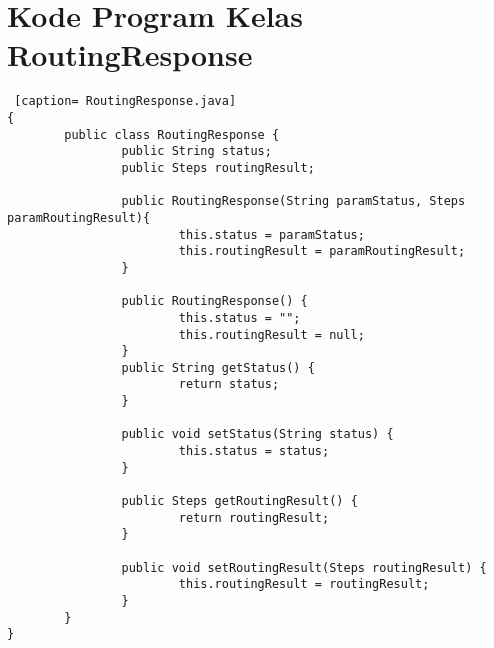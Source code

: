 \chapter{Kode Program Kelas RoutingResponse}
\label{Kode Program Kelas RoutingResponse}

\begin{lstlisting} [caption= RoutingResponse.java]
{ 
		public class RoutingResponse {
				public String status;
				public Steps routingResult;

				public RoutingResponse(String paramStatus, Steps paramRoutingResult){
						this.status = paramStatus;
						this.routingResult = paramRoutingResult;
				}

				public RoutingResponse() {
						this.status = "";
						this.routingResult = null;
				}
				public String getStatus() {
						return status;
				}

				public void setStatus(String status) {
						this.status = status;
				}

				public Steps getRoutingResult() {
						return routingResult;
				}

				public void setRoutingResult(Steps routingResult) {
						this.routingResult = routingResult;
				}
		}
}
\end{lstlisting}